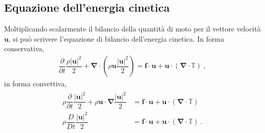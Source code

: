 \documentclass[letterpaper,10pt,italian]{jupyterBook}
\begin{document}
\subsection{Equazione dell’energia cinetica}
\label{\detokenize{polimi/fluidmechanics-ita/template/capitoli/04_bilanci/04teoria:equazione-dell-energia-cinetica}}
\sphinxAtStartPar
Moltiplicando scalarmente il bilancio della quantità di moto per il
vettore velocità \(\mathbf{u}\), si può scrivere l’equazione di bilancio
dell’energia cinetica. In forma conservativa,
\begin{equation*}
\begin{split}\dfrac{\partial}{\partial t}\dfrac{\rho|\mathbf{u}|^2}{2}  + \mathbf{\nabla} \cdot \left( \rho \mathbf{u} \dfrac{|\mathbf{u}|^2}{2} \right) = \mathbf{f} \cdot \mathbf{u} + \mathbf{u} \cdot ( \mathbf{\nabla} \cdot \mathbb{T} ) \ ,\end{split}
\end{equation*}
\sphinxAtStartPar
in forma convettiva,
\begin{equation*}
\begin{split}\begin{aligned}
   \rho \dfrac{\partial}{\partial t} \dfrac{|\mathbf{u}|^2}{2} +  \rho \mathbf{u}  \cdot \mathbf{\nabla} \dfrac{|\mathbf{u}|^2}{2} & = \mathbf{f} \cdot \mathbf{u} + \mathbf{u} \cdot (\mathbf{\nabla} \cdot \mathbb{T} ) \\ 
   \rho \dfrac{D }{D t}\dfrac{|\mathbf{u}|^2}{2} & = \mathbf{f}\cdot \mathbf{u} + \mathbf{u} \cdot ( \mathbf{\nabla} \cdot \mathbb{T} ) \ . \\ 
  \end{aligned}\end{split}
\end{equation*}
\end{document}
